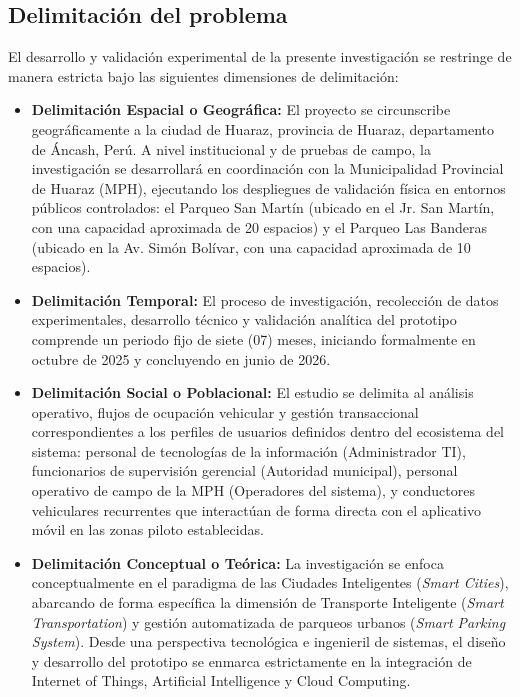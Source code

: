 \documentclass[12pt,a4paper]{article}
\begin{document}
\subsection{Delimitación del problema}

El desarrollo y validación experimental de la presente investigación se restringe de manera estricta bajo las siguientes dimensiones de delimitación:

\begin{itemize}[leftmargin=*]
	\item \textbf{Delimitación Espacial o Geográfica:} El proyecto se circunscribe geográficamente a la ciudad de Huaraz, provincia de Huaraz, departamento de Áncash, Perú. A nivel institucional y de pruebas de campo, la investigación se desarrollará en coordinación con la Municipalidad Provincial de Huaraz (MPH), ejecutando los despliegues de validación física en entornos públicos controlados: el Parqueo San Martín (ubicado en el Jr. San Martín, con una capacidad aproximada de 20 espacios) y el Parqueo Las Banderas (ubicado en la Av. Simón Bolívar, con una capacidad aproximada de 10 espacios).
	
	\item \textbf{Delimitación Temporal:} El proceso de investigación, recolección de datos experimentales, desarrollo técnico y validación analítica del prototipo comprende un periodo fijo de siete (07) meses, iniciando formalmente en octubre de 2025 y concluyendo en junio de 2026.
	
	\item \textbf{Delimitación Social o Poblacional:} El estudio se delimita al análisis operativo, flujos de ocupación vehicular y gestión transaccional correspondientes a los perfiles de usuarios definidos dentro del ecosistema del sistema: personal de tecnologías de la información (Administrador TI), funcionarios de supervisión gerencial (Autoridad municipal), personal operativo de campo de la MPH (Operadores del sistema), y conductores vehiculares recurrentes que interactúan de forma directa con el aplicativo móvil en las zonas piloto establecidas.
	
	\item \textbf{Delimitación Conceptual o Teórica:} La investigación se enfoca conceptualmente en el paradigma de las Ciudades Inteligentes (\textit{Smart Cities}), abarcando de forma específica la dimensión de Transporte Inteligente (\textit{Smart Transportation}) y gestión automatizada de parqueos urbanos (\textit{Smart Parking System}). Desde una perspectiva tecnológica e ingenieril de sistemas, el diseño y desarrollo del prototipo se enmarca estrictamente en la integración de Internet of Things, Artificial Intelligence y Cloud Computing.
\end{itemize}
\end{document}
